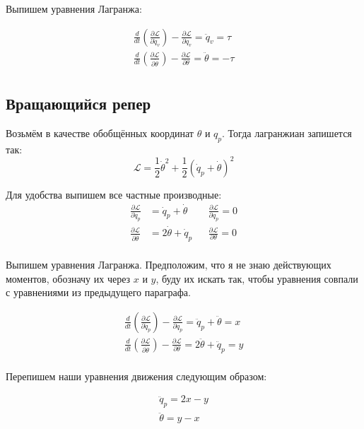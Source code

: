 \documentclass{article}
\begin{document}
Выпишем уравнения Лагранжа:

\begin{align*}
\frac{d}{dt}\left(\frac{\partial\mathcal L}{\partial\dot q_v}\right) - \frac{\partial\mathcal L}{\partial q_v} = \ddot q_v = \tau\\
\frac{d}{dt}\left(\frac{\partial\mathcal L}{\partial\dot \theta}\right) - \frac{\partial\mathcal L}{\partial \theta} = \ddot\theta = -\tau\\
\end{align*}

\subsection{Вращающийся репер}

Возьмём в качестве обобщённых координат $\theta$ и $q_p$. Тогда лагранжиан запишется так:
$$
\mathcal{L} = \frac{1}{2} \dot \theta^2 + \frac{1}{2}(\dot q_p+\dot\theta)^2
$$

Для удобства выпишем все частные производные:
\begin{align*}
\frac{\partial\mathcal L}{\partial\dot q_p} &= \dot q_p + \dot\theta && \frac{\partial\mathcal L}{\partial q_p} = 0\\
\frac{\partial\mathcal L}{\partial\dot\theta} &= 2\dot\theta +\dot q_p &&  \frac{\partial\mathcal L}{\partial\theta} = 0\\
\end{align*}

Выпишем уравнения Лагранжа. Предположим, что я не знаю действующих моментов, обозначу их через $x$ и $y$, буду их искать так, чтобы уравнения совпали с уравнениями из предыдущего параграфа.

\begin{align*}
\frac{d}{dt}\left(\frac{\partial\mathcal L}{\partial\dot q_p}\right) - \frac{\partial\mathcal L}{\partial q_p}= \ddot q_p + \ddot\theta = x\\
\frac{d}{dt}\left(\frac{\partial\mathcal L}{\partial\dot \theta}\right) - \frac{\partial\mathcal L}{\partial \theta}= 2\ddot\theta +  \ddot q_p   = y\\
\end{align*}

Перепишем наши уравнения движения следующим образом:

\begin{align*}
\ddot q_p = 2x - y\\
\ddot\theta = y - x
\end{align*}
\end{document}
